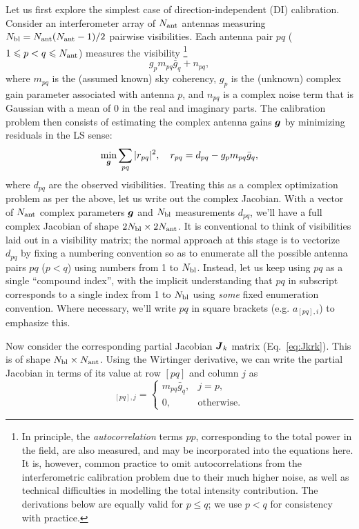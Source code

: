 \documentclass[useAMS,usenatbib]{mn2e}
\newcommand{\mat}[1]{{\bmath{#1}}}
\newcommand{\JJ}{\mat{J}} %
\numberwithin{equation}{section}
\providecommand{\DIFdelbegin}{} %
\providecommand{\DIFdelend}{} %
\begin{document}
Let us first explore the simplest case of direction-independent (DI) calibration. Consider an interferometer
array of $N_\mathrm{ant}$ antennas measuring $N_\mathrm{bl}=N_\mathrm{ant}(N_\mathrm{ant}-1)/2$ pairwise visibilities. Each antenna pair
$pq$ ($1\leqslant p<q\leqslant N_\mathrm{ant}$) 
measures the visibility\DIFdelbegin %
\DIFdelend \footnote{In principle, the {\em autocorrelation} terms $pp$, corresponding to the
total power in the field, are also measured, and may be incorporated into the equations here. 
It is, however, common practice to omit autocorrelations from the interferometric
calibration problem due to their much higher noise, as well as technical difficulties in modelling the
total intensity contribution. The derivations below are equally valid for $p\leq q$; we use $p<q$ for consistency
with practice.}
\DIFdelbegin %
\DIFdelend \begin{equation}
\label{eq:RIME:unpol}
g_p m_{pq} \bar{g}_q + n_{pq},
\end{equation}
where $m_{pq}$ is the (assumed known) sky coherency, $g_p$ is the (unknown) complex gain parameter 
associated with antenna $p$, and $n_{pq}$ is a complex noise term that is Gaussian with a mean of 0 in the real and 
imaginary parts. The calibration problem then consists of estimating the complex antenna gains $\bmath{g}$ by
minimizing residuals in the LS sense:
\begin{equation}
\label{eq:cal:DI}
\min_{\bmath{g}}\sum_{pq}|r_{pq}|^2,~~~r_{pq}=d_{pq}-g_p m_{pq} \bar{g}_q, 
\end{equation}
where $d_{pq}$ are the observed visibilities. Treating this as a complex optimization problem as per the above, 
let us write out the complex Jacobian. 
With a vector of $N_\mathrm{ant}$ complex parameters $\bmath{g}$ and $N_\mathrm{bl}$ measurements $d_{pq}$, we'll have a full complex
Jacobian of shape $2N_\mathrm{bl}\times2N_\mathrm{ant}$. It is conventional
to think of visibilities laid out in a visibility matrix; the normal approach at this stage is to vectorize $d_{pq}$ 
by fixing a numbering convention so as to enumerate all the possible antenna pairs $pq$ ($p<q$) using numbers from 1 to $N_\mathrm{bl}$.
Instead, let us keep using $pq$ as a single ``compound index'', with the implicit understanding that $pq$ in 
subscript corresponds to a single index from 1 to $N_\mathrm{bl}$ using \emph{some} fixed enumeration convention. 
Where necessary, we'll write $pq$ in square brackets (e.g. $a_{[pq],i}$) to emphasize this.

Now consider the corresponding partial Jacobian $\JJ_k$ matrix (Eq.~\ref{eq:Jkrk}). This is of shape $N_\mathrm{bl}\times N_\mathrm{ant}$. 
Using the Wirtinger derivative, we can write the
partial Jacobian in terms of its value at row $[pq]$ and column $j$ as 
\begin{equation}
[ \JJ_k ]_{[pq],j} = \left \{  
  \begin{array}{ll} 
  m_{pq}\bar{g}_q,& j=p, \\
  0, & \mathrm{otherwise.}
  \end{array}
\right .
\end{equation}
\end{document}
